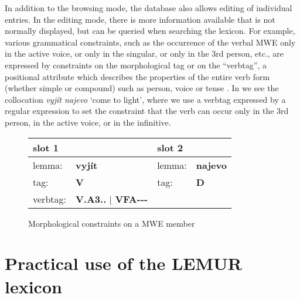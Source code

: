 \documentclass[output=paper,colorlinks,citecolor=brown]{langscibook}
\begin{document}
In addition to the browsing mode, the database also allows editing of individual entries. In the editing mode, there is more information available that is not normally displayed, but can be queried when searching the lexicon. For example, various grammatical constraints, such as the occurrence of the verbal MWE only in the active voice, or only in the singular, or only in the 3rd person, etc., are expressed by constraints on the morphological tag or on the ``verbtag'', a positional attribute which describes the properties of the entire verb form (whether simple or compound) such as person, voice or tense \citep[see][]{Jelinek:2021}. 
In  we see the collocation \emph{vyjít najevo} ‘come to light’, where we use a verbtag expressed by a regular expression to set the constraint that the verb can occur only in the 3rd person, in the active voice, or in the infinitive.

\begin{figure}%
    \centering
    \begin{tabular}{|lp{3cm}|ll|}
    \hline
    \multicolumn{2}{|l|}{\textbf{slot 1}} & \multicolumn{2}{l|}{\textbf{slot 2}} \\
    \hline
    lemma: & \textbf{vyjít} & lemma: & \textbf{najevo} \\    %
    tag: & \textbf{V} & tag: & \textbf{D} \\     %
    verbtag: & \textbf{V.A3..} | \textbf{VFA-{-}-} & &  \\
    \hline
    \end{tabular}
    \caption{Morphological constraints on a MWE member}
    \label{fig:najevo}
\end{figure}



\section{Practical use of the LEMUR lexicon}
\label{sec:use}
\end{document}
